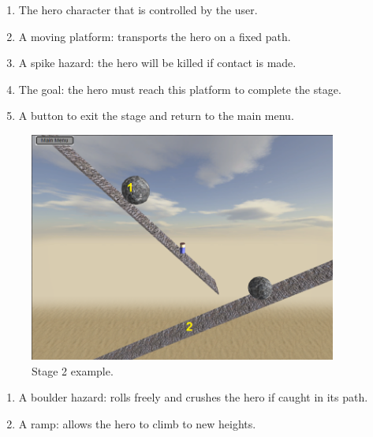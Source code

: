 \documentclass[12pt, titlepage]{article}
\begin{document}
\begin{enumerate}
  \item The hero character that is controlled by the user.
  \item A moving platform: transports the hero on a fixed path.
  \item A spike hazard: the hero will be killed if contact is made.
  \item The goal:  the hero must reach this platform to complete the stage.
  \item A button to exit the stage and return to the main menu.
\end{enumerate}

\newpage

\begin{figure}[hTB]
\begin{center}
\includegraphics[width=0.90\textwidth]{stage2}
\caption{Stage 2 example.} \label{fig:stage2}
\end{center}
\end{figure}


\begin{enumerate}
  \item A boulder hazard:  rolls freely and crushes the hero if caught in its path.
  \item A ramp:  allows the hero to climb to new heights.
\end{enumerate}

\newpage
\end{document}
